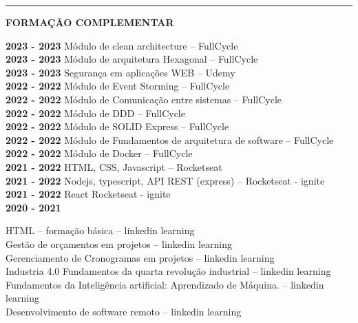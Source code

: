 \documentclass[12pt, a4paper]{article}
\newcommand{\LlinhaG}{2pt} %
\newcommand{\TlinhaG}{17cm}  %
\begin{document}
\begin{center}	%
	\rule{\TlinhaG}{\LlinhaG}
\end{center}

\begin{center}
	\textbf{FORMAÇÃO COMPLEMENTAR}\\
\end{center}
\begin{flushleft}

	\textbf{2023 - 2023} Módulo de clean architecture – FullCycle\\
	\hfill \break
	\textbf{2023 - 2023} Módulo de arquitetura Hexagonal – FullCycle\\
	\hfill \break
	\textbf{2023 - 2023} Segurança em aplicações WEB – Udemy\\
	\hfill \break
	\textbf{2022 - 2022} Módulo de Event Storming – FullCycle\\
	\hfill \break
	\textbf{2022 - 2022} Módulo de Comunicação entre sistemas – FullCycle\\
	\hfill \break
	\textbf{2022 - 2022} Módulo de DDD – FullCycle\\
	\hfill \break
	\textbf{2022 - 2022} Módulo de SOLID Express – FullCycle\\
	\hfill \break
	\textbf{2022 - 2022} Módulo de Fundamentos de arquitetura de software – FullCycle\\
	\hfill \break
	\textbf{2022 - 2022} Módulo de Docker – FullCycle\\
	\hfill \break
	\textbf{2021 - 2022} HTML, CSS, Javascript – Rocketseat\\
	\hfill \break
	\textbf{2021 - 2022} Nodejs, typescript, API REST (express) – Rocketseat - ignite\\
	\hfill \break
	\textbf{2021 - 2022} React Rocketseat - ignite\\
	\hfill \break
	\textbf{2020 - 2021} \\
	\begin{flushleft}
		HTML – formação básica – linkedin learning\\
		Gestão de orçamentos em projetos – linkedin learning\\
		Gerenciamento de Cronogramas em projetos – linkedin learning\\
		Industria 4.0 Fundamentos da quarta revolução industrial – linkedin learning\\
		Fundamentos da Inteligência artificial: Aprendizado de Máquina. – linkedin learning\\
		Desenvolvimento de software remoto – linkedin learning

\end{flushleft}
\end{flushleft}
\end{document}
